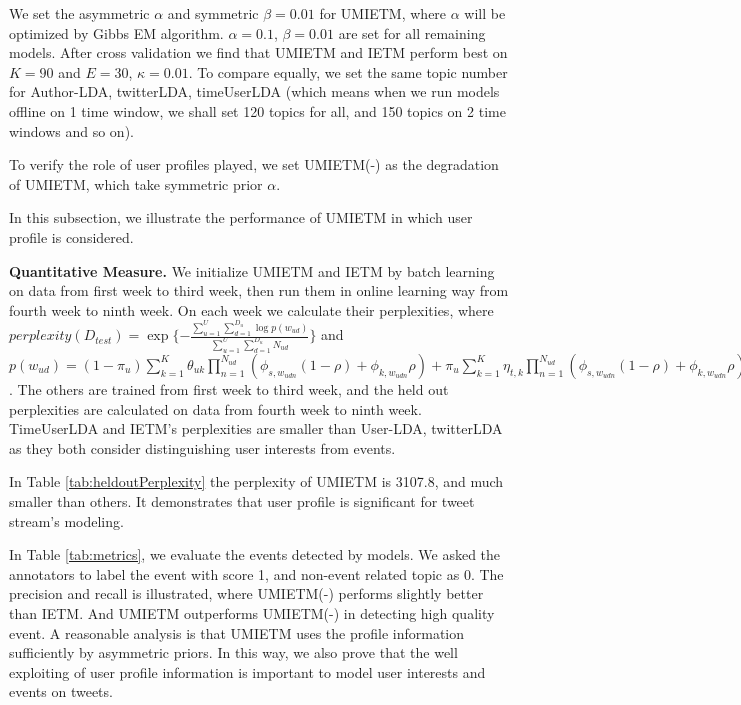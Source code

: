 \documentclass{sig-alternate-05-2015}
\begin{document}
We set the asymmetric \(\alpha\) and symmetric \(\beta=0.01\) for UMIETM, where \(\alpha\) will be optimized by Gibbs EM algorithm\cite{wallach2008structured}.
\(\alpha=0.1\), \(\beta=0.01\) are set for all remaining models. 
After cross validation we find that UMIETM and IETM perform best on \(K=90\) and \(E=30\), \(\kappa=0.01\).
To compare equally, we set the same topic number for Author-LDA, twitterLDA, timeUserLDA (which means when we run models offline on 1 time window, we shall set 120 topics for all, and 150 topics on 2 time windows and so on).

To verify the role of user profiles played, we set UMIETM(-) as the degradation of UMIETM, which take symmetric prior \(\alpha\).

In this subsection, we illustrate the performance of UMIETM in which user profile is considered.

\textbf{Quantitative Measure.}
We initialize UMIETM and IETM by batch learning on data from first week to third week, then run them in online learning way from fourth week to ninth week.
On each week we calculate their perplexities\cite{wallach2009evaluation}, where \(perplexity(D_{test})=\exp{\{-\frac{\sum_{u=1}^{U}\sum_{d=1}^{D_u}\log{p(w_{ud})}}{\sum_{u=1}^{U}\sum_{d=1}^{D_u}N_{ud}}\}}\) and \(p(w_{ud})=(1-\pi_u)\sum_{k=1}^{K}\theta_{uk}\prod_{n=1}^{N_{ud}}(\phi_{s,w_{udn}}(1-\rho)+\phi_{k,w_{udn}}\rho)+\pi_u \sum_{k=1}^{K}\eta_{t,k}\prod_{n=1}^{N_{ud}}(\phi_{s,w_{udn}}(1-\rho)+\phi_{k,w_{udn}}\rho)\).
The others are trained from first week to third week, and the held out perplexities are calculated on data from fourth week to ninth week.
TimeUserLDA and IETM's perplexities are smaller than User-LDA, twitterLDA as they both consider distinguishing user interests from events.

In Table \ref{tab:heldoutPerplexity} the perplexity of UMIETM is 3107.8, and much smaller than others. It demonstrates that user profile is significant for tweet stream's modeling.

In Table \ref{tab:metrics}, we evaluate the events detected by models. We asked the annotators to label the event with score 1, and non-event related topic as 0. 
The precision and recall is illustrated, where UMIETM(-) performs slightly better than IETM. 
And UMIETM outperforms UMIETM(-) in detecting high quality event. 
A reasonable analysis is that UMIETM uses the profile information sufficiently by asymmetric priors. 
In this way, we also prove that the well exploiting of user profile information is important to model user interests and events on tweets. 
\end{document}
